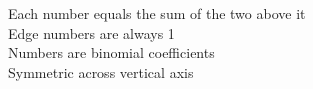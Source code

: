 \documentclass[preview]{standalone}
\begin{document}
Each number equals the sum of the two above it\\Edge numbers are always 1\\Numbers are binomial coefficients\\Symmetric across vertical axis\\
\end{document}
